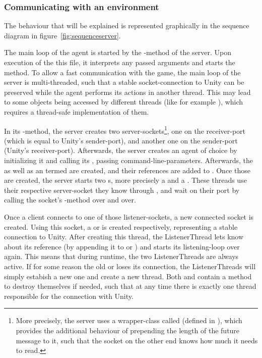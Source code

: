 \subsubsection{Communicating with an environment}

The behaviour that will be explained is represented graphically in the sequence diagram in figure~\ref{fig:sequenceserver}. 

The main loop of the agent is started by the -method of the server. Upon execution of the this file, it interprets any passed arguments and starts the method. %
To allow a fast communication with the game, the main loop of the server is multi-threaded, such that a stable socket-connection to Unity can be preserved while the agent performs its actions in another thread. This may lead to some objects being accessed by different threads (like for example ), which requires a thread-safe implementation of them.

In its -method, the server creates two server-sockets\footnote{More precisely, the server uses a wrapper-class called  (defined in ), which provides the additional behaviour of prepending the length of the future message to it, such that the socket on the other end knows how much it needs to read.}, one on the receiver-port (which is equal to Unity's sender-port), and another one on the sender-port (Unity's receiver-port). Afterwards, the server creates an agent of choice by initializing it and calling its , passing command-line-parameters. Afterwards, the   as well as an  termed  are created, and their references are added to . Once those are created, the server starts two s, more precisely a  and a . These threads use their respective server-socket they know through , and wait on their port by calling the socket's -method over and over.

Once a client connects to one of those listener-sockets, a new connected socket is created. Using this socket, a  or  is created respectively, representing a stable connection to Unity. After creating this thread, the ListenerThread lets  know about its reference (by appending it to  or ) and starts its listening-loop over again. This means that during runtime, the two ListenerThreads are always active. If for some reason the old  or  loses its connection, the ListenerThreads will simply estabish a new one and create a new thread. Both  and   contain a method to destroy themselves if needed, such that at any time there is exactly one thread responsible for the connection with Unity.

